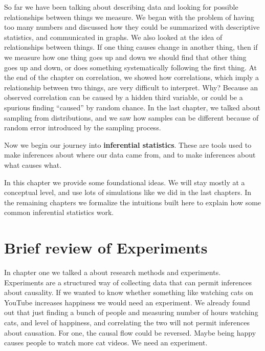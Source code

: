 \documentclass[
  letterpaper,
  DIV=11,
  numbers=noendperiod]{scrreprt}
\begin{document}
So far we have been talking about describing data and looking for
possible relationships between things we measure. We began with the
problem of having too many numbers and discussed how they could be
summarized with descriptive statistics, and communicated in graphs. We
also looked at the idea of relationships between things. If one thing
causes change in another thing, then if we measure how one thing goes up
and down we should find that other thing goes up and down, or does
something systematically following the first thing. At the end of the
chapter on correlation, we showed how correlations, which imply a
relationship between two things, are very difficult to interpret. Why?
Because an observed correlation can be caused by a hidden third
variable, or could be a spurious finding ``caused'' by random chance. In
the last chapter, we talked about sampling from distributions, and we
saw how samples can be different because of random error introduced by
the sampling process.

Now we begin our journey into \textbf{inferential statistics}. These are
tools used to make inferences about where our data came from, and to
make inferences about what causes what.

In this chapter we provide some foundational ideas. We will stay mostly
at a conceptual level, and use lots of simulations like we did in the
last chapters. In the remaining chapters we formalize the intuitions
built here to explain how some common inferential statistics work.

\section{Brief review of Experiments}\label{brief-review-of-experiments}

In chapter one we talked a about research methods and experiments.
Experiments are a structured way of collecting data that can permit
inferences about causality. If we wanted to know whether something like
watching cats on YouTube increases happiness we would need an
experiment. We already found out that just finding a bunch of people and
measuring number of hours watching cats, and level of happiness, and
correlating the two will not permit inferences about causation. For one,
the causal flow could be reversed. Maybe being happy causes people to
watch more cat videos. We need an experiment.
\end{document}
